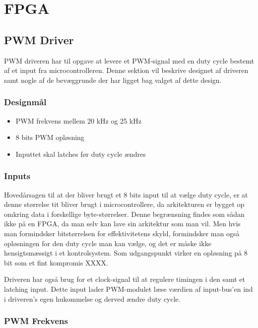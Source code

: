\section{FPGA}

\subsection{PWM Driver}

PWM driveren har til opgave at levere et PWM-signal med en duty cycle bestemt af et input fra microcontrolleren. Denne sektion vil beskrive designet af driveren samt nogle af de bevæggrunde der har ligget bag valget af dette design.

\subsubsection{Designmål}

\begin{itemize}

\item PWM frekvens mellem 20 kHz og 25 kHz
\item 8 bits PWM opløsning
\item Inputtet skal latches før duty cycle ændres

\end{itemize}

\subsubsection{Inputs}

Hovedårsagen til at der bliver brugt et 8 bits input til at vælge duty cycle, er at denne størrelse tit bliver brugt i microcontrollere, da arkitekturen er bygget op omkring data i forskellige byte-størrelser. Denne begrænsning findes som sådan ikke på en FPGA, da man selv kan lave sin arkitektur som man vil. Men hvis man formindsker bitstørrelsen for effektivitetens skyld, formindsker man også opløsningen for den duty cycle man kan vælge, og det er måske ikke hensigtsmæssigt i et kontrolsystem. Som udgangspunkt virker en opløsning på 8 bit som et fint kompromis XXXX.

Driveren har også brug for et clock-signal til at regulere timingen i den samt et latching input. Dette input lader PWM-modulet læse værdien af input-bus'en ind i driveren's egen hukommelse og derved ændre duty cycle.

\subsubsection{PWM Frekvens}


